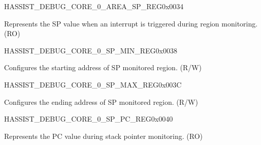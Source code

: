 \begin{register}{H}{ASSIST\_DEBUG\_CORE\_0\_AREA\_SP\_REG}{0x0034}\label{regdesc:ASSISTDEBUGCORE0AREASPREG}
%
\regnewline%
\begin{regdesc}\begin{reglist}
\label{fielddesc:ASSISTDEBUGCORE0AREASP}\item [ASSIST\_DEBUG\_CORE\_0\_AREA\_SP] Represents the SP value when an interrupt is triggered during region monitoring. (RO)
\end{reglist}\end{regdesc}
\end{register}


\begin{register}{H}{ASSIST\_DEBUG\_CORE\_0\_SP\_MIN\_REG}{0x0038}\label{regdesc:ASSISTDEBUGCORE0SPMINREG}
%
\regnewline%
\begin{regdesc}\begin{reglist}
\label{fielddesc:ASSISTDEBUGCORE0SPMIN}\item [ASSIST\_DEBUG\_CORE\_0\_SP\_MIN] Configures the starting address of SP monitored region. (R/W)
\end{reglist}\end{regdesc}
\end{register}


\begin{register}{H}{ASSIST\_DEBUG\_CORE\_0\_SP\_MAX\_REG}{0x003C}\label{regdesc:ASSISTDEBUGCORE0SPMAXREG}
%
\regnewline%
\begin{regdesc}\begin{reglist}
\label{fielddesc:ASSISTDEBUGCORE0SPMAX}\item [ASSIST\_DEBUG\_CORE\_0\_SP\_MAX] Configures the ending address of SP monitored region. (R/W)
\end{reglist}\end{regdesc}
\end{register}


\begin{register}{H}{ASSIST\_DEBUG\_CORE\_0\_SP\_PC\_REG}{0x0040}\label{regdesc:ASSISTDEBUGCORE0SPPCREG}
%
\regnewline%
\begin{regdesc}\begin{reglist}
\label{fielddesc:ASSISTDEBUGCORE0SPPC}\item [ASSIST\_DEBUG\_CORE\_0\_SP\_PC] Represents the PC value during stack pointer monitoring. (RO)
\end{reglist}\end{regdesc}
\end{register}


